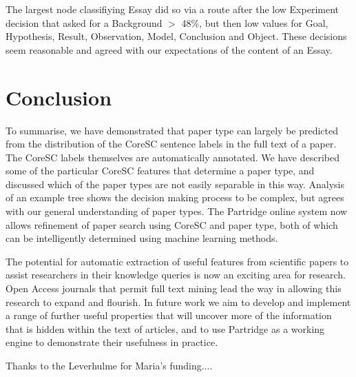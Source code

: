 \documentclass{svmult}
\begin{document}
The largest node classifiying Essay did so via a route after the low Experiment decision that asked for a Background $>$ 48\%, but then low values for Goal, Hypothesis, Result, Observation, Model, Conclusion and Object. These decisions seem reasonable and agreed with our expectations of the content of an Essay.

\section{Conclusion}
\label{sec:4}

To summarise, we have demonstrated that paper type can largely be predicted from the distribution of the CoreSC sentence labels in the full text of a paper. The CoreSC labels themselves are automatically annotated. We have described some of the particular CoreSC features that determine a paper type, and discussed which of the paper types are not easily separable in this way. Analysis of an example tree shows the decision making process to be complex, but agrees with our general understanding of paper types. The Partridge online system now allows refinement of paper search using CoreSC and paper type, both of which can be intelligently determined using machine learning methods. 



The potential for automatic extraction of useful features from scientific papers to assist researchers in their knowledge queries is now an exciting area for research. Open Access journals that permit full text mining lead the way in allowing this research to expand and flourish. In future work we aim to develop and implement a range of further useful properties that will uncover more of the information that is hidden within the text of articles, and to use Partridge as a working engine to demonstrate their usefulness in practice.


\begin{acknowledgement}
Thanks to the Leverhulme for Maria's funding....
\end{acknowledgement}





%
\end{document}
